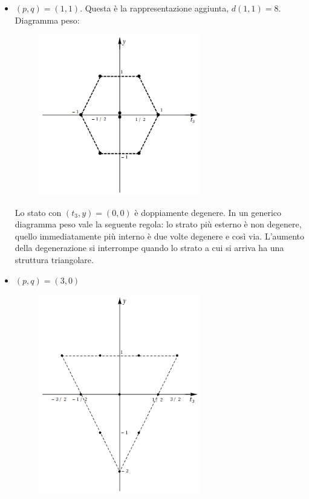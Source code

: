 \documentclass[12pt,a4paper]{article}
\theoremstyle{definition}
\numberwithin{equation}{section}
\begin{document}
\begin{itemize}
\begin{figure}[h]
\end{figure}
\cleardoublepage
\item $(p,q)=(1,1)$. Questa è la rappresentazione aggiunta, $d(1,1)=8$. Diagramma peso:
\begin{figure}[h]
\centering
\includegraphics[width=200pt,keepaspectratio=true]{Addons/11}
\end{figure}
	
Lo stato con $(t_3,y)=(0,0)$ è doppiamente degenere. In un generico diagramma peso vale la seguente regola: lo strato più esterno è non degenere, quello immediatamente più interno è due volte degenere e così via. L'aumento della degenerazione si interrompe quando lo strato a cui si arriva ha una struttura triangolare.

\item $(p,q)=(3,0)$
\begin{figure}[h]
\centering
\includegraphics[width=200pt,keepaspectratio=true]{Addons/30}


\end{figure}
\end{itemize}
\end{document}
